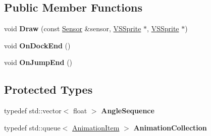 \subsection*{Public Member Functions}
\begin{DoxyCompactItemize}
\item 
void {\bfseries Draw} (const \hyperlink{classRadar_1_1Sensor}{Sensor} \&sensor, \hyperlink{classVSSprite}{V\+S\+Sprite} $\ast$, \hyperlink{classVSSprite}{V\+S\+Sprite} $\ast$)\hypertarget{classRadar_1_1PlaneDisplay_ac8eba8daca05f2ba1f18d577292d9d04}{}\label{classRadar_1_1PlaneDisplay_ac8eba8daca05f2ba1f18d577292d9d04}

\item 
void {\bfseries On\+Dock\+End} ()\hypertarget{classRadar_1_1PlaneDisplay_a44253bdf7b7375122883dc8b3950ad58}{}\label{classRadar_1_1PlaneDisplay_a44253bdf7b7375122883dc8b3950ad58}

\item 
void {\bfseries On\+Jump\+End} ()\hypertarget{classRadar_1_1PlaneDisplay_aa25326dd03715e7ebaa5b33c64dafe5d}{}\label{classRadar_1_1PlaneDisplay_aa25326dd03715e7ebaa5b33c64dafe5d}

\end{DoxyCompactItemize}
\subsection*{Protected Types}
\begin{DoxyCompactItemize}
\item 
typedef std\+::vector$<$ float $>$ {\bfseries Angle\+Sequence}\hypertarget{classRadar_1_1PlaneDisplay_a1ac373b86ed66149186f9cb94699a749}{}\label{classRadar_1_1PlaneDisplay_a1ac373b86ed66149186f9cb94699a749}

\item 
typedef std\+::queue$<$ \hyperlink{structRadar_1_1PlaneDisplay_1_1AnimationItem}{Animation\+Item} $>$ {\bfseries Animation\+Collection}\hypertarget{classRadar_1_1PlaneDisplay_aba3de6d4e3f1bc15db9a0a4d521eb69d}{}\label{classRadar_1_1PlaneDisplay_aba3de6d4e3f1bc15db9a0a4d521eb69d}

\end{DoxyCompactItemize}
